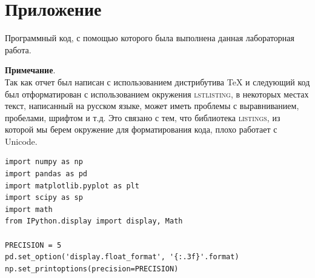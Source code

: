 \documentclass[a4paper, 14pt]{extarticle}
\begin{document}


\section{Приложение}

Программный код, с помощью которого была выполнена данная лабораторная работа.\\

\vspace{20pt}

\noindent \textbf{Примечание}.\\

\noindent Так как отчет был написан с использованием дистрибутива TeX и 
следующий код был отформатирован с использованием окружения \textsc{lstlisting}, 
в некоторых местах текст, написанный на русском языке, может иметь проблемы 
с выравниванием, пробелами, шрифтом и т.д. Это связано с тем, что библиотека 
\textsc{listings}, из которой мы берем окружение для форматирования кода, 
плохо работает с Unicode.

\vspace{20pt}




\lstset{style=mystyle, language=Python, extendedchars=\true}

\begin{lstlisting}[caption={Подключение библиотек}, label={lst:1}]
import numpy as np
import pandas as pd
import matplotlib.pyplot as plt
import scipy as sp
import math
from IPython.display import display, Math

PRECISION = 5
pd.set_option('display.float_format', '{:.3f}'.format)
np.set_printoptions(precision=PRECISION)
\end{lstlisting}
\end{document}
